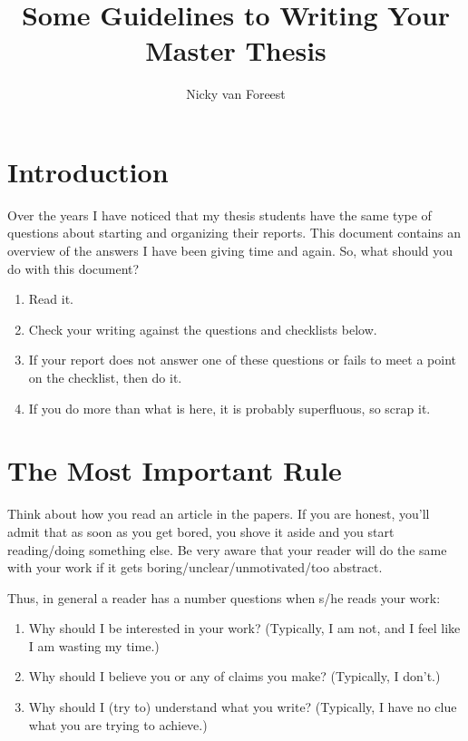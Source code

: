 \documentclass{article}
\title{Some Guidelines to Writing Your Master Thesis}
\author{Nicky van Foreest}
\begin{document}
\maketitle

\section{Introduction}
\label{sec:introduction-1}

Over the years I have noticed that my thesis students have the same
type of questions about starting and organizing their reports. This
document contains an overview of the answers I have been giving time
and again. So, what should you do with this document? 
\begin{enumerate}
\item Read it.
\item Check your writing against the questions and checklists below.
\item If your report does not answer one of these questions or fails
  to meet a point on the checklist, then do it.
\item If you do more than what is here, it is probably superfluous, so
  scrap it.
\end{enumerate}

\section{The Most Important Rule}
\label{sec:most-important-rule}

Think about how you read an article in the papers. If you are honest,
you'll admit that as soon as you get bored, you shove it aside and you
start reading/doing something else. Be very aware that your reader
will do the same with your work if it gets
boring/unclear/unmotivated/too abstract.

Thus, in general a reader has a number questions when s/he reads your
work:
  \begin{enumerate}
  \item Why should I be interested in your work? (Typically, I am not,
    and I feel like I am wasting my time.) \label{item:1}
  \item Why should I believe you or any of claims you make? (Typically, I don't.) \label{item:2}
  \item Why should I (try to) understand what you write?  (Typically,
    I have no clue what you are trying to achieve.) \label{item:3}
  \end{enumerate}
\end{document}
